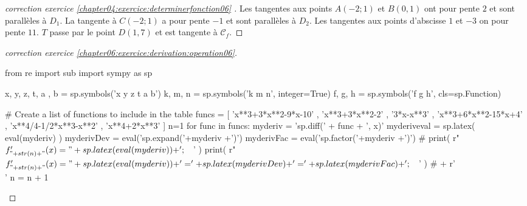 \documentclass[main.tex]{subfiles}
\begin{document}
\begin{proof}[correction exercice \ref{chapter04:exercice:determinerfonction06} ]
	Les tangentes aux points $A(-2;1)$ et $B(0,1)$ ont pour pente $2$ et sont parallèles à $D_1$. 
	La tangente à $C(-2;1)$  a pour pente $-1$ et sont parallèles à $D_2$. 
	Les tangentes aux points d'abscisse $1$ et $-3$ on pour pente $11$. $T$ passe par le point $D(1,7)$ et est tangente à $\mathscr{C}_f$.
\end{proof} 

\begin{proof}[correction exercice \ref{chapter06:exercice:derivation:operation06}] %
\noindent
\begin{pycode}
from re import sub
import sympy as sp

x, y, z, t, a , b = sp.symbols('x y z t a b')
k, m, n = sp.symbols('k m n', integer=True)
f, g, h = sp.symbols('f g h', cls=sp.Function)

# Create a list of functions to include in the table
funcs = [
'x**3+3*x**2-9*x-10'
, 'x**3+3*x**2-2' 
, '3*x-x**3' 
, 'x**3+6*x**2-15*x+4'
, 'x**4/4-1/2*x**3-x**2'
, 'x**4+2*x**3' 
]
n=1 
for func in funcs: 
	myderiv = 'sp.diff(' + func + ', x)' 
	myderiveval = sp.latex( eval(myderiv) )
	myderivDev =  eval('sp.expand('+myderiv +')')
	myderivFac =  eval('sp.factor('+myderiv +')')  
	#	print(   r"$f'_{"+ str(n)+"}(x)=" + sp.latex( eval(myderiv) ) + '; \quad$' ) 
	print(   r"$f'_{"+ str(n)+"}(x)=" + sp.latex( eval(myderiv) ) + '=' + sp.latex(myderivDev)  + '=' + sp.latex(myderivFac) + '; \quad$' ) 
	# + r'\\' 
	n     = n + 1 
\end{pycode}
\end{proof}
\end{document}
